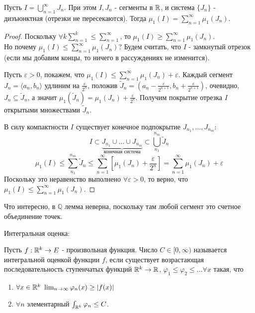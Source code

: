 \begin{theorem*}
    \begin{lemma*}
        Пусть $I = \bigcup_{n=1}^\infty J_n$. При этом $I, J_n$ - сегменты в $\mathbb{R}$, и система $\{J_n\}$ - дизъюнктная (отрезки не пересекаются). Тогда $\mu_1(I) = \sum_{n=1}^{\infty} \mu_1(J_n)$.
        \begin{proof}
            Поскольку $\forall k \sum_{n=1}^{k} \le \sum_{n=1}^{\infty}$, то $\mu_1(I) \ge \sum_{n=1}^{\infty} \mu_1(J_n)$. \\ Но почему $\mu_1(I) \le \sum_{n=1}^{\infty} \mu_1(J_n)$?
            Будем считать, что $I$ - замкнутый отрезок (если мы добавим концы, то ничего в рассуждениях не изменится). 
            \par
            Пусть $\varepsilon > 0$, покажем, что $\mu_1(I) \le \sum_{n=1}^{\infty} \mu_1(J_n) + \varepsilon$. Каждый сегмент $J_n = \langle a_n, b_n \rangle$ удлиним на $\frac{\varepsilon}{2^n}$, положив $\tilde{J}_n = (a_n - \frac{\varepsilon}{2^{n+1}}, b_n + \frac{\varepsilon}{2^{n+1}})$, очевидно, $J_n \subseteq \tilde{J}_n$, а значит $\mu_1(\tilde{J}_n) = \mu_1(J_n) + \frac{\varepsilon}{2^n}$.
            Получим покрытие отрезка $I$ открытыми множествами $\tilde{J}_n$. 
            \par
            В силу компактности $I$ существует конечное подпокрытие $J_{n_1}, \hdots, J_{n_m}$:
            \[I \subset \underbrace{J_{n_1} \cup \hdots \cup J_{n_m}}_{\text{конечная система}} \subset \bigcup_{n_1}^{n_m}\tilde{J}_n\]
            \[\mu_1(I) \le \sum_{n_1}^{n_m}\tilde{J}_n \le \sum_{n=1}^{\infty}\left[ \mu_1(J_n) + \frac{\varepsilon}{2^n} \right] = \sum_{n=1}^{\infty} \mu_1(J_n) + \varepsilon\]
            Поскольку это неравенство выполнено $\forall \varepsilon > 0$, то верно, что $\mu_1(I) \le \sum_{n=1}^{\infty} \mu_1(J_n)$.
        \end{proof}
        Что интересно, в $\mathbb{Q}$ лемма неверна, поскольку там любой сегмент это счетное объединение точек.
    \end{lemma*}
\end{theorem*}

\begin{definition*}
    Интегральная оценка:
    \par
    Пусть $f:\mathbb{R}^k \to E$ - произвольная функция. Число $C \in [0, \infty)$ называется интегральной оценкой функции $f$, если существует возрастающая последовательность ступенчатых функций $\mathbb{R}^k \to \mathbb{R}$, $\varphi_1 \le \varphi_2 \le \hdots \forall x$ такая, что 
    \begin{enumerate}
        \item $\forall x \in \mathbb{R}^k \ \lim_{n\to \infty} \varphi_n(x) \ge \left| f(x) \right|$
        \item $\forall n$ элементарный $\int_{\mathbb{R}^k} \varphi_n \le C$.
    \end{enumerate}
\end{definition*}

